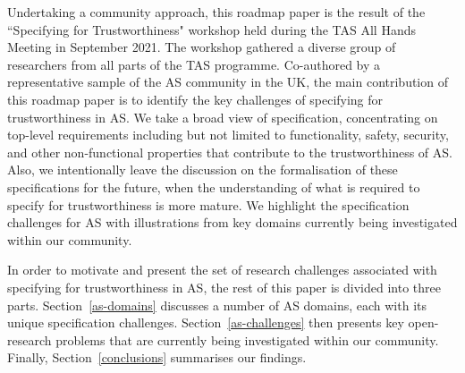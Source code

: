 \documentclass[sigconf,nonacm]{acmart}%
\begin{document}
	Undertaking a community approach, this roadmap paper is the result of the ``Specifying for Trustworthiness" workshop held during the TAS All Hands Meeting in September 2021. The workshop gathered a diverse group of researchers from all parts of the TAS programme. Co-authored by a representative sample of the AS community in the UK, the main contribution of this roadmap paper is to identify the key challenges of specifying for trustworthiness in AS. We take a broad view of specification, concentrating on top-level requirements including but not limited to functionality, safety, security, and other non-functional properties that contribute to the trustworthiness of AS. Also, we intentionally leave the discussion on the formalisation of these specifications for the future, when the understanding of what is required to specify for trustworthiness is more mature. We highlight the specification challenges for AS with illustrations from key domains currently being investigated within our community. 
	
	In order to motivate and present the set of research challenges associated with specifying for trustworthiness in AS, the rest of this paper is divided into three parts. Section~\ref{as-domains} discusses a number of AS domains, each with its unique specification challenges. Section~\ref{as-challenges} then presents key open-research problems that are currently being investigated within our community. Finally, Section~\ref{conclusions} summarises our findings.
	
\end{document}

